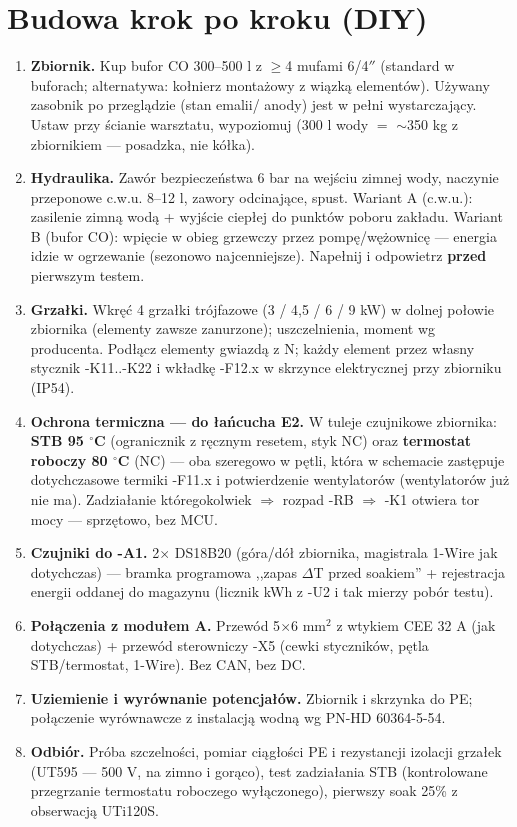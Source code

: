 \documentclass[11pt,a4paper]{article}
\begin{document}
\section{Budowa krok po kroku (DIY)}
\begin{enumerate}
\item \textbf{Zbiornik.} Kup bufor CO 300--500 l z $\ge$4 mufami 6/4$''$ (standard w buforach;
alternatywa: kołnierz montażowy z wiązką elementów). Używany zasobnik po przeglądzie (stan emalii/
anody) jest w pełni wystarczający. Ustaw przy ścianie warsztatu, wypoziomuj (300 l wody $=$
$\sim$350 kg z zbiornikiem --- posadzka, nie kółka).
\item \textbf{Hydraulika.} Zawór bezpieczeństwa 6 bar na wejściu zimnej wody, naczynie przeponowe
c.w.u. 8--12 l, zawory odcinające, spust. Wariant A (c.w.u.): zasilenie zimną wodą + wyjście ciepłej
do punktów poboru zakładu. Wariant B (bufor CO): wpięcie w obieg grzewczy przez pompę/wężownicę ---
energia idzie w ogrzewanie (sezonowo najcenniejsze). Napełnij i odpowietrz \textbf{przed}
pierwszym testem.
\item \textbf{Grzałki.} Wkręć 4 grzałki trójfazowe (3 / 4,5 / 6 / 9 kW) w dolnej połowie zbiornika
(elementy zawsze zanurzone); uszczelnienia, moment wg producenta. Podłącz elementy gwiazdą z N;
każdy element przez własny stycznik -K11..-K22 i wkładkę -F12.x w skrzynce elektrycznej przy
zbiorniku (IP54).
\item \textbf{Ochrona termiczna --- do łańcucha E2.} W tuleje czujnikowe zbiornika: \textbf{STB
95 $^\circ$C} (ogranicznik z ręcznym resetem, styk NC) oraz \textbf{termostat roboczy 80 $^\circ$C}
(NC) --- oba szeregowo w pętli, która w schemacie zastępuje dotychczasowe termiki -F11.x i
potwierdzenie wentylatorów (wentylatorów już nie ma). Zadziałanie któregokolwiek $\Rightarrow$
rozpad -RB $\Rightarrow$ -K1 otwiera tor mocy --- sprzętowo, bez MCU.
\item \textbf{Czujniki do -A1.} 2$\times$ DS18B20 (góra/dół zbiornika, magistrala 1-Wire jak
dotychczas) --- bramka programowa ,,zapas $\Delta$T przed soakiem'' + rejestracja energii oddanej
do magazynu (licznik kWh z -U2 i tak mierzy pobór testu).
\item \textbf{Połączenia z modułem A.} Przewód 5$\times$6 mm$^2$ z wtykiem CEE 32 A (jak dotychczas)
+ przewód sterowniczy -X5 (cewki styczników, pętla STB/termostat, 1-Wire). Bez CAN, bez DC.
\item \textbf{Uziemienie i wyrównanie potencjałów.} Zbiornik i skrzynka do PE; połączenie
wyrównawcze z instalacją wodną wg PN-HD 60364-5-54.
\item \textbf{Odbiór.} Próba szczelności, pomiar ciągłości PE i rezystancji izolacji grzałek
(UT595 --- 500 V, na zimno i gorąco), test zadziałania STB (kontrolowane przegrzanie termostatu
roboczego wyłączonego), pierwszy soak 25\% z obserwacją UTi120S.
\end{enumerate}
\end{document}
